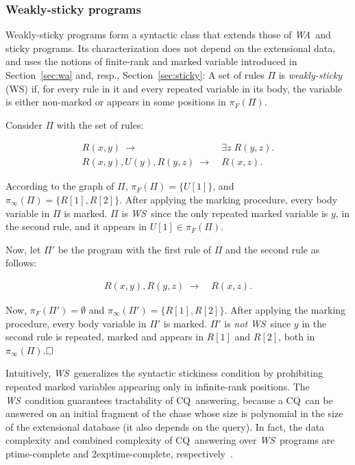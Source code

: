 \documentclass[format=acmsmall, review=false, screen=true]{acmart}
\newcommand{\cq}{CQ}
\newcommand{\boxtheorem}{\ensuremath{\hfill \Box}}
\newcommand{\prg}{\Pi}
\newcommand{\rank}{\pi}
\newcommand{\finiteRank}{\rank_F}
\newcommand{\infiniteRank}{\rank_\infty}
\newcommand{\m}{\;\!\!}
\newcommand{\WS}{{\em W\m{}S}}
\newcommand{\WA}{{\em W\m{}A}}
\newcommand{\exptime}{{\sc exptime}}
\newcommand{\ptime}{{\sc ptime}}
\begin{document}
{{\subsubsection{Weakly-sticky programs} \label{sec:ws}

Weakly-sticky programs form a syntactic class that extends those of \WA \ and sticky programs.  Its characterization does not depend on the extensional data, and uses the notions of finite-rank and marked variable introduced in Section~\ref{sec:wa} and, resp., Section~\ref{sec:sticky}: A set of rules $\prg$ is {\em weakly-sticky} (WS) if, for every rule in it and every repeated variable in its body, the variable is either non-marked or appears in some positions in $\finiteRank(\prg)$.

\vspace{-2mm}
\begin{example} Consider $\prg$ with the set of rules:

\vspace{-4mm}
\begin{align*}
R(x,y) ~\rightarrow&~ \exists z\; R(y,z).\\
R(x,y),U(y),R(y,z) ~\rightarrow&~ R(x,z).
\end{align*}
\vspace{-4mm}

According to the graph of $\prg$, $\finiteRank(\prg)=\{U[1]\}$, and $\infiniteRank(\prg)=\{R[1],R[2]\}$. After applying the marking procedure, every body variable in $\prg$ is marked. $\prg$ is \WS \ since the only repeated marked variable is $y$, in the second rule, and it appears in $U[1] \in \finiteRank(\prg)$.

Now, let $\prg'$ be the program with the first rule of $\prg$ and the second rule as follows:

\vspace{-4mm}
\begin{align*}
R(x,y),R(y,z) ~\rightarrow&~ R(x,z).
\end{align*}
\vspace{-4mm}

\noindent Now, $\finiteRank(\prg')=\emptyset$ and $\infiniteRank(\prg')=\{R[1],R[2]\}$. After applying the marking procedure, every body variable in $\prg'$ is marked. $\prg'$ is {\em not} \WS \ since $y$ in the second rule is repeated, marked and appears in $R[1]$ and $R[2]$, both in $\infiniteRank(\prg)$.\boxtheorem\end{example}

Intuitively, \WS \ generalizes the syntactic stickiness condition by prohibiting repeated marked variables appearing only in infinite-rank positions. The \WS \ condition guarantees tractability of \cq \ answering, because a \cq \ can be answered on an initial fragment of the chase whose size is polynomial in the size of the extensional database (it also depends on the query). In fact, the data complexity and combined complexity of \cq \ answering over \WS \ programs are  \ptime-complete and 2\exptime-complete, respectively~\cite{cali12is}.

}}
\end{document}
